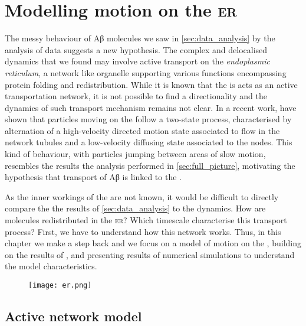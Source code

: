 
\chapter{Modelling motion on the \textsc{er}}\label{sec:modelling}

The messy behaviour of Aβ molecules we saw in \cref{sec:data_analysis} by the analysis of  data suggests a new hypothesis. The complex and delocalised dynamics that we found may involve active transport on the \emph{endoplasmic reticulum}, a network like organelle supporting various functions encompassing protein folding and redistribution. While it is known that the  is acts as an active transportation network, it is not possible to find a directionality and the dynamics of such transport mechanism remains not clear.
In a recent work, \citeauthor{holcman2018single} have shown that particles moving on the  follow a two-state process, characterised by alternation of a high-velocity directed motion state associated to flow in the network tubules and a low-velocity diffusing state associated to the nodes. This kind of behaviour, with particles jumping between areas of slow motion, resembles the results the analysis performed in \cref{sec:full_picture}, motivating the hypothesis that transport of Aβ is linked to the .

As the inner workings of the  are not known, it would be difficult to directly compare the the results of \cref{sec:data_analysis} to the  dynamics. How are molecules redistributed in the \textsc{er}? Which timescale characterise this transport process? First, we have to understand how this network works. Thus, in this chapter we make a step back and we focus on a model of motion on the , building on the results of \citeauthor{holcman2018single}, and presenting results of numerical simulations to understand the model characteristics.

\begin{figure}[t!]
  \texttt{[image: er.png]}
\end{figure}

\section{Active network model}

